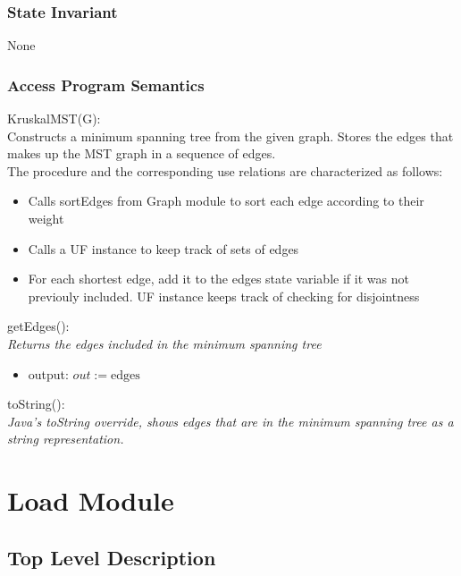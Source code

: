 \documentclass[12pt]{article}
\begin{document}
\subsubsection* {State Invariant}

None

\subsubsection* {Access Program Semantics}

KruskalMST(G):\\
Constructs a minimum spanning tree from the given graph. Stores the edges
that makes up the MST graph in a sequence of edges.\\
\noindent
The procedure and the corresponding use relations are characterized as follows:
\begin{itemize}
\item Calls sortEdges from Graph module to sort each edge according to their weight
\item Calls a UF instance to keep track of sets of edges
\item For each shortest edge, add it to the edges state variable if it was not
previouly included. UF instance keeps track of checking for disjointness
\end{itemize}

\noindent
getEdges():\\
\textit{Returns the edges included in the minimum spanning tree}
\begin{itemize}
\item output: $out := \mbox{edges}$
\end{itemize}

\noindent
toString():\\
\textit{Java's toString override, shows edges that are in the minimum spanning tree
as a string representation.}

\newpage


\section*{Load Module}

\subsection* {Top Level Description}
\end{document}
